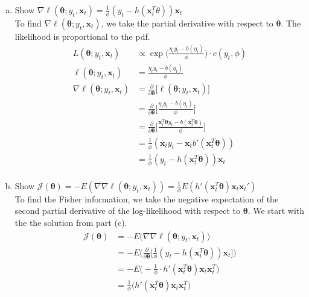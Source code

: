 \documentclass{article}
\renewcommand{\vec}[1]{\boldsymbol{#1}}
\newcommand{\pd}[2]{\frac{\partial#1}{\partial#2}}
\begin{document}
\begin{enumerate}[(a)]
\item Show $\nabla\ell(\vec{\theta}; y_t, \vec{x}_t) = \frac{1}{\phi}(y_t - h(\vec{x}_t^T\theta))\vec{x}_t$\\
To find $\nabla\ell(\vec{\theta}; y_t, \vec{x}_t)$, we take the partial derivative with respect to $\vec{\theta}$. The likelihood is proportional to the pdf.
\begin{align*}
L(\vec{\theta}; y_t, \vec{x}_t) &\propto \exp\bigg(\frac{\eta_ty_t - b(\eta_t)}{\phi}\bigg)\cdot c(y_t, \phi)\\
\ell(\vec{\theta}; y_t, \vec{x}_t) &=  \frac{\eta_ty_t - b(\eta_t)}{\phi}\\
\nabla\ell(\vec{\theta}; y_t, \vec{x}_t) &= \pd{}{\vec{\theta}}\bigg[\ell(\vec{\theta}; y_t, \vec{x}_t)\bigg]\\
&= \pd{}{\vec{\theta}}\bigg[\frac{\eta_ty_t - b(\eta_t)}{\phi}\bigg]\\
&= \pd{}{\vec{\theta}}\bigg[\frac{\vec{x}_t^T\vec{\theta}y_t - b(\vec{x}_t^T\vec{\theta})}{\phi}\bigg]\\
&= \frac{1}{\phi}(\vec{x}_ty_t - \vec{x}_tb'(\vec{x}_t^T\vec{\theta}))\\
&= \frac{1}{\phi}(y_t - h(\vec{x}_t^T\vec{\theta}))\vec{x}_t\\
\end{align*}

\item Show $\mathcal{J}(\vec{\theta}) = -E(\nabla\nabla\ell(\vec{\theta}; y_t, \vec{x}_t)) = \frac{1}{\phi}E(h'(\vec{x}_t^T\vec{\theta})\vec{x}_t\vec{x}_t')$\\
To find the Fisher information, we take the negative expectation of the second partial derivative of the log-likelihood with respect to $\vec{\theta}$. We start with the the solution from part (c).
\begin{align*}
\mathcal{J}(\vec{\theta}) &= -E\bigg(\nabla\nabla\ell(\vec{\theta}; y_t, \vec{x}_t)\bigg)\\
&= -E\bigg(\pd{}{\vec{\theta}}\bigg[\frac{1}{\phi}(y_t - h(\vec{x}_t^T\vec{\theta}))\vec{x}_t\bigg]\bigg)\\
&= -E\bigg(-\frac{1}{\phi}\cdot h'(\vec{x}_t^T\vec{\theta})\vec{x}_t\vec{x}_t^T\bigg)\\
&= \frac{1}{\phi}\bigg(h'(\vec{x}_t^T\vec{\theta})\vec{x}_t\vec{x}_t^T\bigg)\\
\end{align*}

\end{enumerate}
\end{document}
